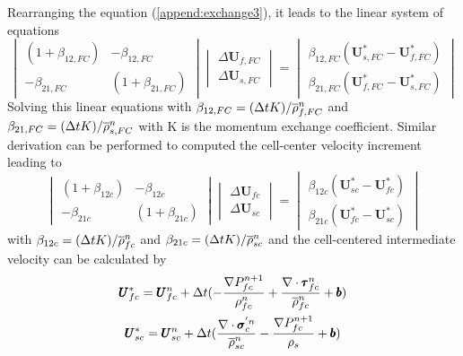 \documentclass[preprint,12pt]{elsarticle}
\begin{document}
%
%
Rearranging the equation (\ref{append:exchange3}), it leads to the linear system of equations
%
\[ \begin{vmatrix} (1 + \beta_{12,FC})  &  -\beta_{12,FC} \\
                  -\beta_{21,FC}       &  (1 + \beta_{21,FC})
    \end {vmatrix}
    \begin{vmatrix} \Delta \pmb{U}_{f,FC} \\
                    \Delta \pmb{U}_{s,FC}
    \end {vmatrix}
    =
    \begin{vmatrix}  \beta_{12,FC}(\pmb{U}_{s,FC}^{*} - \pmb{U}_{f,FC}^{*}) \\
                    \beta_{21,FC}(\pmb{U}_{f,FC}^{*} - \pmb{U}_{s,FC}^{*})
    \end {vmatrix}                
\]
%
%
Solving this linear equations with $\beta_{12,FC} = (\Delta{t} K)/\overline{\rho}_{f,FC}^n$ and $\beta_{21,FC} = (\Delta{t} K)/\overline{\rho}_{s,FC}^n$ with K is the momentum exchange coefficient. Similar derivation can be performed to computed the cell-center velocity increment leading to
%
\[ \begin{vmatrix} (1 + \beta_{12c})  &  -\beta_{12c} \\
                  -\beta_{21c}       &  (1 + \beta_{21c})
    \end {vmatrix}
    \begin{vmatrix} \Delta \pmb{U}_{fc} \\
                    \Delta \pmb{U}_{sc}
    \end {vmatrix}
    =
    \begin{vmatrix}  \beta_{12c}(\pmb{U}_{sc}^{*} - \pmb{U}_{fc}^{*}) \\
                    \beta_{21c}(\pmb{U}_{fc}^{*} - \pmb{U}_{sc}^{*})
    \end {vmatrix}                
\]
%
%
with $\beta_{12c} = (\Delta{t} K)/\overline{\rho}_{fc}^n$ and $\beta_{21c} = (\Delta{t} K)/\overline{\rho}_{sc}^n$ and the cell-centered intermediate velocity can be calculated by
%
\begin{equation}
\begin{gathered}
\pmb{U}_{fc}^{*} = \pmb{U}_{fc}^{n} + \Delta{t} (-\frac{\nabla P_{fc}^{n+1}}{\rho_{fc}^n}  + \frac{\nabla \cdot \pmb{\tau}_{fc}^{n}}{\overline{\rho}^n_{fc}} + \pmb{b}) \\
\pmb{U}_{sc}^{*} = \pmb{U}_{sc}^{n} + \Delta{t} (\frac{\nabla \cdot \pmb{\sigma}_c^{'n}}{\overline{\rho}^n_{sc}}    - \frac{\nabla P_{fc}^{n+1}}{\rho_s}  + \pmb{b})
\end {gathered}
\end {equation}
\end{document}
